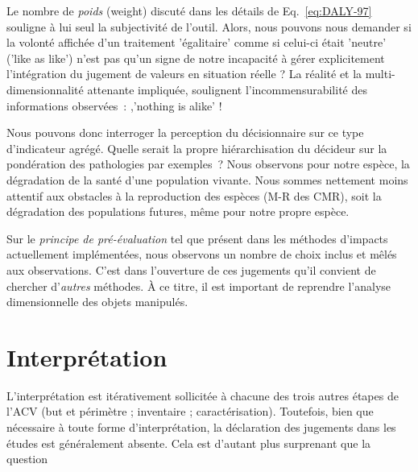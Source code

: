 Le nombre de \emph{poids} (weight) discuté dans les détails de Eq.~\eqref{eq:DALY-97} souligne à lui seul la subjectivité de l'outil.
Alors, nous pouvons nous demander si la volonté affichée d'un traitement 'égalitaire' comme si celui-ci était 'neutre' ('like as like') n'est pas qu'un signe de notre incapacité à gérer explicitement l'intégration du jugement de valeurs en situation réelle ?
La réalité et la multi-dimensionnalité attenante impliquée, soulignent l'incommensurabilité des informations observées~: ,'nothing is alike' !

Nous pouvons donc interroger la perception du décisionnaire sur ce type d'indicateur agrégé.
Quelle serait la propre hiérarchisation du décideur sur la pondération des pathologies par exemples~?
Nous observons pour notre espèce, la dégradation de la santé d'une population vivante.
Nous sommes nettement moins attentif aux obstacles à la reproduction des espèces (M-R des CMR), soit la dégradation des populations futures, même pour notre propre espèce.


Sur le \emph{principe de pré-évaluation} tel que présent dans les méthodes d'impacts actuellement implémentées, nous observons un nombre de choix inclus et mêlés aux observations.
C'est dans l'ouverture de ces jugements qu'il convient de chercher d'\emph{autres} méthodes.
À ce titre, il est important de reprendre l'analyse dimensionnelle des objets manipulés.

\section{Interprétation}
L'interprétation est itérativement sollicitée à chacune des trois autres étapes de l'ACV (but et périmètre ; inventaire ; caractérisation).
Toutefois, bien que nécessaire à toute forme d'interprétation, la déclaration des jugements dans les études est généralement absente.
Cela est d'autant plus surprenant que la question 

